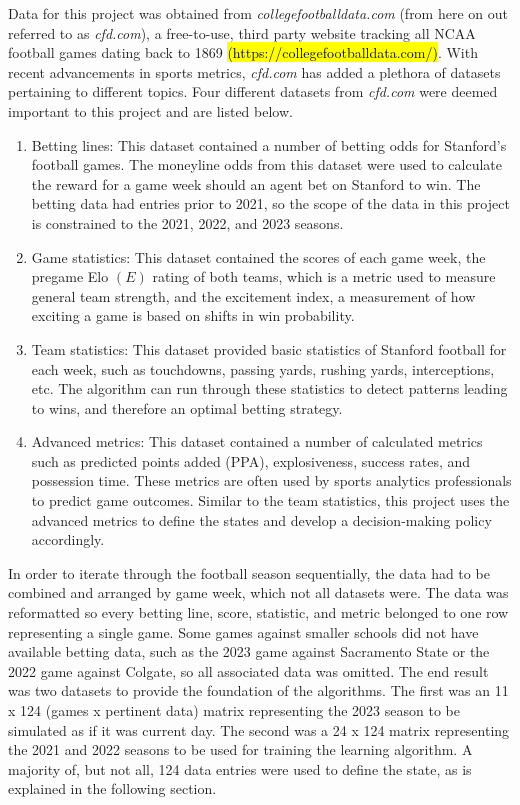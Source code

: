 \documentclass[conf]{new-aiaa}
\begin{document}
Data for this project was obtained from \textit{collegefootballdata.com} (from here on out referred to as \textit{cfd.com}), a free-to-use, third party website tracking all NCAA football games dating back to 1869 \hl{(https://collegefootballdata.com/)}. With recent advancements in sports metrics, \textit{cfd.com} has added a plethora of datasets pertaining to different topics. Four different datasets from \textit{cfd.com} were deemed important to this project and are listed below.
\begin{enumerate}
    \item Betting lines: This dataset contained a number of betting odds for Stanford's football games. The moneyline odds from this dataset were used to calculate the reward for a game week should an agent bet on Stanford to win. The betting data had entries prior to 2021, so the scope of the data in this project is constrained to the 2021, 2022, and 2023 seasons.
    \item Game statistics: This dataset contained the scores of each game week, the pregame Elo $(E)$ rating of both teams, which is a metric used to measure general team strength, and the excitement index, a measurement of how exciting a game is based on shifts in win probability.
    \item Team statistics: This dataset provided basic statistics of Stanford football for each week, such as touchdowns, passing yards, rushing yards, interceptions, etc. The algorithm can run through these statistics to detect patterns leading to wins, and therefore an optimal betting strategy.
    \item Advanced metrics: This dataset contained a number of calculated metrics such as predicted points added (PPA), explosiveness, success rates, and possession time. These metrics are often used by sports analytics professionals to predict game outcomes. Similar to the team statistics, this project uses the advanced metrics to define the states and develop a decision-making policy accordingly.
\end{enumerate}
In order to iterate through the football season sequentially, the data had to be combined and arranged by game week, which not all datasets were. The data was reformatted so every betting line, score, statistic, and metric belonged to one row representing a single game. Some games against smaller schools did not have available betting data, such as the 2023 game against Sacramento State or the 2022 game against Colgate, so all associated data was omitted. The end result was two datasets to provide the foundation of the algorithms. The first was an 11 x 124 (games x pertinent data) matrix representing the 2023 season to be simulated as if it was current day. The second was a 24 x 124 matrix representing the 2021 and 2022 seasons to be used for training the learning algorithm. A majority of, but not all, 124 data entries were used to define the state, as is explained in the following section. 
\end{document}
